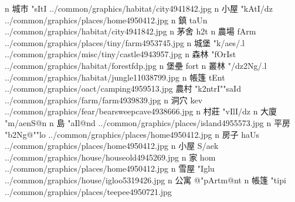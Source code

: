 \begin{tGegzkD}{11}{}
         {n} {城市}      {}{"sItI}           {../common/graphics/habitat/city4941842.jpg}        {}       {n} {小屋}      {}{"kAtI{/dz}}      {../common/graphics/places/home4950412.jpg}         {}
         {n} {鎮}        {}{taUn}            {../common/graphics/habitat/city4941842.jpg}        {}           {n} {茅舍}      {}{h2t}             {}{}                                                                         
         {n} {農場}      {}{fArm}            {../common/graphics/places/tiny/farm4953745.jpg}    {}        {n} {城堡}      {}{"k{/ae}s{/.l}}   {../common/graphics/misc/tiny/castle4943957.jpg}    {}
       {n} {森林}      {}{"fOrIst}         {../common/graphics/habitat/forestfdp.jpg}          {}                      {n} {堡壘}      {}{fort}            {}{}                                                                         
       {n} {叢林}      {}{"{/dz}2Ng{/.l}}  {../common/graphics/habitat/jungle11038799.jpg}     {}          {n} {帳篷}      {}{tEnt}            {../common/graphics/oact/camping4959513.jpg}        {}
   {農村}      {}{"k2ntrI""saId} {../common/graphics/farm/farm4939839.jpg}           {}          {n} {洞穴}      {}{kev}             {../common/graphics/fear/bearsweepcave4938666.jpg}  {}
      {n} {村莊}      {}{"vIlI{/dz}}      {}{}                                                                                {n} {大廈}      {}{"m{/ae}nS@n}     {}{}                                                                         
       {n} {島}        {}{"aIl@nd}         {../common/graphics/places/island4955573.jpg}       {}      {n} {平房}      {}{"b2Ng@""lo}    {../common/graphics/places/home4950412.jpg}         {}
        {n} {房子}      {}{haUs}            {../common/graphics/places/home4950412.jpg}         {}         {n} {小屋}      {}{S{/ae}k}         {../common/graphics/house/houseold4945269.jpg}      {}
         {n} {家}        {}{hom}             {../common/graphics/places/home4950412.jpg}         {}         {n} {雪屋}      {}{"Iglu}           {../common/graphics/house/igloo5319426.jpg}         {}
    {n} {公寓}      {}{@"pArtm@nt}      {}{}                                                                                  {n} {帳篷}      {}{"tipi}           {../common/graphics/places/teepee4950721.jpg}       {}
\end{tGegzkD}
